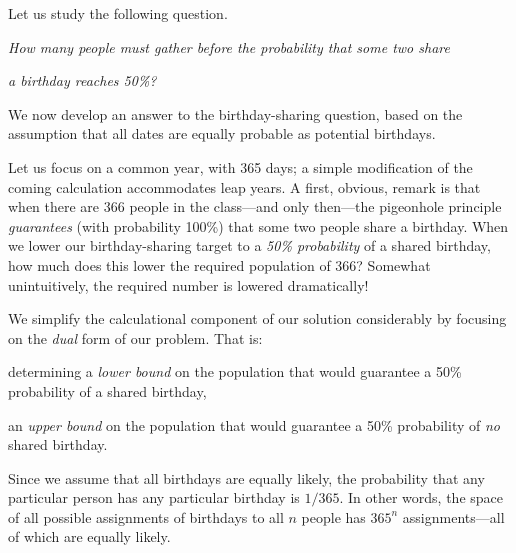 \smallskip

Let us study the following question.

\smallskip

{\it How many people must gather before the probability that some two share}

{\it a birthday reaches 50\%?}

\medskip


\noindent
We now develop an answer to the birthday-sharing question, based on the assumption
that all dates are equally probable as potential birthdays.

\bigskip

Let us focus on a common year, with 365 days; a simple modification of the coming calculation 
accommodates leap years.  A first, obvious, remark is that when there are 366 people in the 
class---and only then---the pigeonhole principle {\em guarantees} (with probability 100\%) 
that some two people share a birthday.  When we lower our birthday-sharing target to a 
{\em 50\% probability} of a shared birthday, how much does this lower the required population 
of 366?  Somewhat unintuitively, the required number is lowered dramatically!

\bigskip

We simplify the calculational component of our solution considerably by focusing on the 
{\em dual} form of our problem.  That is:

\smallskip

 determining a {\em lower bound} on the population
that would guarantee a 50\% probability of a shared birthday,

 an {\em upper bound} on the population that would
guarantee a 50\% probability of {\em no} shared birthday.

\medskip

Since we assume that all birthdays are equally likely, the probability
that any particular person has any particular birthday is $1/365$.  In
other words, the space of all possible assignments of birthdays to all
$n$ people has $365^n$ assignments---all of which are equally likely.

